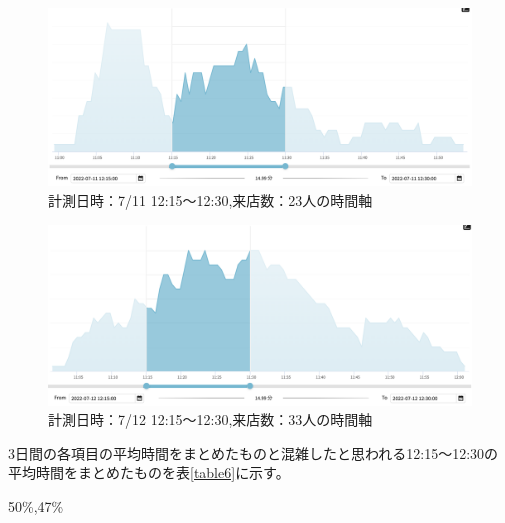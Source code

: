 \documentclass{jsarticle}
\begin{document}
\begin{figure}[H]
  \centering
  \includegraphics[width=14cm]{711a.png}
  \caption{計測日時：7/11 12:15〜12:30,来店数：23人の時間軸}
  \label{fig:711a}
\end{figure}

\begin{figure}[H]
  \centering
  \includegraphics[width=14cm]{712a.png}
  \caption{計測日時：7/12 12:15〜12:30,来店数：33人の時間軸}
  \label{fig:712a}
\end{figure}


3日間の各項目の平均時間をまとめたものと混雑したと思われる12:15〜12:30の平均時間をまとめたものを表\ref{table6}に示す。

50\%,47\%
\end{document}
